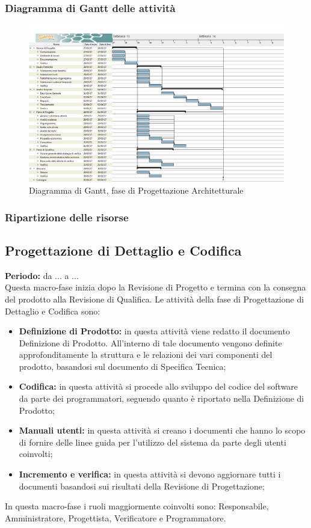 	\subsubsection{Diagramma di Gantt delle attività}
	\begin{figure}[H]
		\centering
		\includegraphics[scale=0.30]{immagini/gantt/progettazione_architetturale.png}
		\caption{Diagramma di Gantt, fase di Progettazione Architetturale}
	\end{figure}
	\subsubsection{Ripartizione delle risorse}
	\subsection{Progettazione di Dettaglio e Codifica}
	\textbf{Periodo:} da ... a ... \\
	Questa macro-fase inizia dopo la Revisione di Progetto e termina con la consegna del prodotto alla Revisione di Qualifica. Le attività della fase di Progettazione di Dettaglio e Codifica sono: \\
	\begin{itemize}
		\item \textbf{Definizione di Prodotto:} in questa attività viene redatto il documento Definizione di Prodotto. All'interno di tale documento vengono definite approfonditamente la struttura e le relazioni dei vari componenti del prodotto, basandosi sul documento di Specifica Tecnica; \\
		\item \textbf{Codifica:} in questa attività si procede allo sviluppo del codice del software da parte dei programmatori, seguendo quanto è riportato nella Definizione di Prodotto; \\
		\item \textbf{Manuali utenti:} in questa attività si creano i documenti che hanno lo scopo
di fornire delle linee guida per l'utilizzo del sistema da parte degli utenti coinvolti; \\
		\item \textbf{Incremento e verifica:} in questa attività si devono aggiornare tutti i documenti
basandosi sui risultati della Revisione di Progettazione; \\
	\end{itemize}
	In questa macro-fase i ruoli maggiormente coinvolti sono: Responsabile, Amministratore, Progettista, Verificatore e Programmatore.
